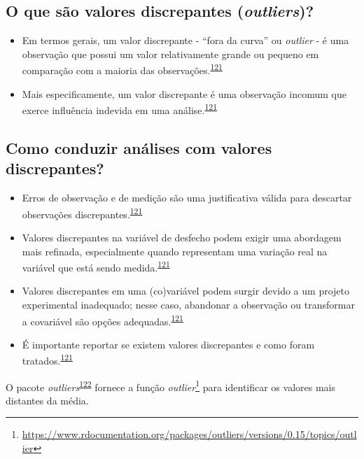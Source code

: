 \documentclass[
  a4paper,
]{book}
\renewcommand{\href}[2]{#2\footnote{\url{#1}}}
\newenvironment{infobox}[1]
  {
  \begin{itemize}
  \renewcommand{\labelitemi}{
    \raisebox{-.7\height}[0pt][0pt]{
      {\setkeys{Gin}{width=3em,keepaspectratio}
        \texttt{[image: \#1]}}
    }
  }
  \setlength{\fboxsep}{1em}
  \begin{blackbox}
  \item
  }
  {
  \end{blackbox}
  \end{itemize}
  }
\begin{document}
\hypertarget{o-que-suxe3o-valores-discrepantes-outliers}{%
\subsection{\texorpdfstring{O que são valores discrepantes (\emph{outliers})?}{O que são valores discrepantes (outliers)?}}\label{o-que-suxe3o-valores-discrepantes-outliers}}

\begin{itemize}
\item
  Em termos gerais, um valor discrepante - ``fora da curva'' ou \emph{outlier} - é uma observação que possui um valor relativamente grande ou pequeno em comparação com a maioria das observações.\textsuperscript{\protect\hyperlink{ref-zuur2009}{121}}
\item
  Mais especificamente, um valor discrepante é uma observação incomum que exerce influência indevida em uma análise.\textsuperscript{\protect\hyperlink{ref-zuur2009}{121}}
\end{itemize}

\hypertarget{como-conduzir-anuxe1lises-com-valores-discrepantes}{%
\subsection{Como conduzir análises com valores discrepantes?}\label{como-conduzir-anuxe1lises-com-valores-discrepantes}}

\begin{itemize}
\item
  Erros de observação e de medição são uma justificativa válida para descartar observações discrepantes.\textsuperscript{\protect\hyperlink{ref-zuur2009}{121}}
\item
  Valores discrepantes na variável de desfecho podem exigir uma abordagem mais refinada, especialmente quando representam uma variação real na variável que está sendo medida.\textsuperscript{\protect\hyperlink{ref-zuur2009}{121}}
\item
  Valores discrepantes em uma (co)variável podem surgir devido a um projeto experimental inadequado; nesse caso, abandonar a observação ou transformar a covariável são opções adequadas.\textsuperscript{\protect\hyperlink{ref-zuur2009}{121}}
\item
  É importante reportar se existem valores discrepantes e como foram tratados.\textsuperscript{\protect\hyperlink{ref-zuur2009}{121}}
\end{itemize}

\begin{infobox}{images/Rlogo}
O pacote \emph{outliers}\textsuperscript{\protect\hyperlink{ref-outliers}{122}} fornece a função \href{https://www.rdocumentation.org/packages/outliers/versions/0.15/topics/outlier}{\emph{outlier}} para identificar os valores mais distantes da média.

\end{infobox}
\end{document}

